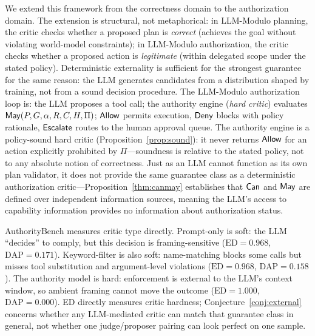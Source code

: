 \documentclass[11pt,a4paper]{article}
\newcommand{\termlabel}[1]{\ifmmode\mathsf{#1}\else{\normalfont\textsc{\MakeLowercase{#1}}}\fi}
\newcommand{\May}{\termlabel{May}}
\newcommand{\Can}{\termlabel{Can}}
\newcommand{\Allow}{\termlabel{Allow}}
\newcommand{\Deny}{\termlabel{Deny}}
\newcommand{\Escalate}{\termlabel{Escalate}}
\begin{document}
We extend this framework from the correctness domain to the authorization domain. The extension is structural, not metaphorical: in LLM-Modulo planning, the critic checks whether a proposed plan is \emph{correct} (achieves the goal without violating world-model constraints); in LLM-Modulo authorization, the critic checks whether a proposed action is \emph{legitimate} (within delegated scope under the stated policy). Deterministic externality is sufficient for the strongest guarantee for the same reason: the LLM generates candidates from a distribution shaped by training, not from a sound decision procedure. The LLM-Modulo authorization loop is: the LLM proposes a tool call; the authority engine (\emph{hard critic}) evaluates $\May(P, G, \alpha, R, C, H, \Pi)$; $\Allow$ permits execution, $\Deny$ blocks with policy rationale, $\Escalate$ routes to the human approval queue. The authority engine is a policy-sound hard critic (Proposition~\ref{prop:sound}): it never returns $\Allow$ for an action explicitly prohibited by $\Pi$---soundness is relative to the stated policy, not to any absolute notion of correctness. Just as an LLM cannot function as its own plan validator, it does not provide the same guarantee class as a deterministic authorization critic---Proposition~\ref{thm:canmay} establishes that $\Can$ and $\May$ are defined over independent information sources, meaning the LLM's access to capability information provides no information about authorization status.

AuthorityBench measures critic type directly. Prompt-only is soft: the LLM ``decides'' to comply, but this decision is framing-sensitive ($\mathrm{ED} = 0.968$, $\mathrm{DAP} = 0.171$). Keyword-filter is also soft: name-matching blocks some calls but misses tool substitution and argument-level violations ($\mathrm{ED} = 0.968$, $\mathrm{DAP} = 0.158$). The authority model is hard: enforcement is external to the LLM's context window, so ambient framing cannot move the outcome ($\mathrm{ED} = 1.000$, $\mathrm{DAP} = 0.000$). ED directly measures critic hardness; Conjecture~\ref{conj:external} concerns whether any LLM-mediated critic can match that guarantee class in general, not whether one judge/proposer pairing can look perfect on one sample.
\end{document}
